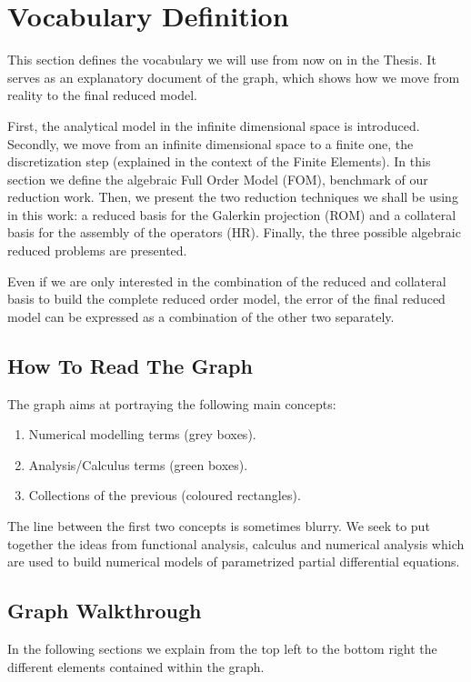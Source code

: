 \documentclass[../main.tex]{subfiles}
\begin{document}
    
\section{Vocabulary Definition}
This section defines the vocabulary we will use from now on in the Thesis. It serves as an explanatory document of the graph, which shows how we move from reality to the final reduced model. 

First, the analytical model in the infinite dimensional space is introduced. 
Secondly, we move from an infinite dimensional space to a finite one, the discretization step (explained in the context of the Finite Elements).
In this section we define the algebraic Full Order Model (FOM), benchmark of our reduction work. 
Then, we present the two reduction techniques we shall be using in this work: a reduced basis for the Galerkin projection (ROM) and a collateral basis for the assembly of the operators (HR). 
Finally, the three possible algebraic reduced problems are presented. 

Even if we are only interested in the combination of the reduced and collateral basis to build the complete reduced order model, the error of the final reduced model can be expressed as a combination of the other two separately. 

\subsection{How To Read The Graph}
The graph aims at portraying the following main concepts:
\begin{enumerate}
    \item Numerical modelling terms (grey boxes).
    \item Analysis/Calculus terms (green boxes).
    \item Collections of the previous (coloured rectangles).
\end{enumerate}
The line between the first two concepts is sometimes blurry. 
We seek to put together the ideas from functional analysis, calculus and numerical analysis which are used to build numerical models of parametrized partial differential equations.

\subsection{Graph Walkthrough}
In the following sections we explain from the top left to the bottom right the different elements contained within the graph. 
\end{document}
